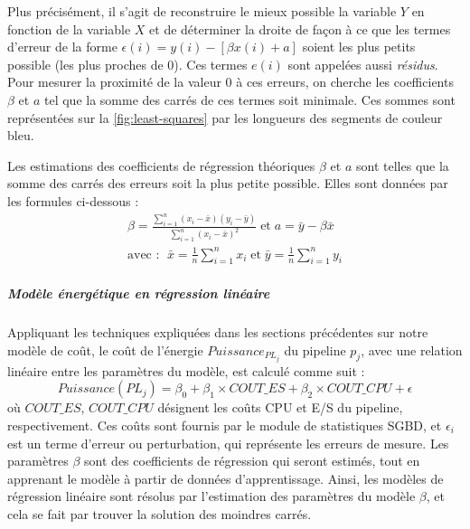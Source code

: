 Plus précisément, il s'agit de reconstruire le mieux possible la variable $Y$ en fonction de la variable $X$ et de déterminer la droite de façon à ce que les termes d'erreur de la forme $\epsilon(i) = y(i) - [\beta x(i) + a ]$ soient les plus petits possible (les plus proches de 0). Ces termes $e(i)$ sont appelées aussi \textit{résidus}. Pour mesurer la proximité de la valeur 0 à ces erreurs, on cherche les coefficients $\beta$ et $a$ tel que la somme des carrés de ces termes soit minimale. Ces sommes sont représentées sur la \ref{fig:least-squares} par les longueurs des segments de couleur bleu.

Les estimations des coefficients de régression théoriques $\beta$ et $a$ sont telles que la somme des carrés des erreurs soit la plus petite possible. Elles sont données par les formules ci-dessous \cite{Neter96} :
 \begin{equation}
 \begin{aligned}
  \beta = \frac{ \sum_{i=1}^{n}(x_i-\bar{x})(y_i-\bar{y}) }{ \sum_{i=1}^{n} (x_i-\bar{x})^2} \; \text{et} \; a = \bar{y} - \beta \bar{x} \\
  \text{avec : } \; \bar{x} = \frac{1}{n} \sum_{i=1}^{n} x_i \; \text{et} \; \bar{y} = \frac{1}{n} \sum_{i=1}^{n} y_i
  \end{aligned}
 \end{equation}

\subparagraph{Modèle énergétique en régression linéaire}
Appliquant les techniques expliquées dans les sections précédentes sur notre modèle de coût, le coût de l'énergie $Puissance_{PL_j} $ du pipeline $p_j$, avec une relation linéaire entre les paramètres du modèle, est calculé comme suit :
\begin{equation} \label{eq:lin-reg-equation}
Puissance(PL_j) = \beta_0 + \beta_1 \times COUT\_ES+ \beta_2 \times COUT\_CPU + \epsilon
\end{equation}
où $COUT\_ES$, $COUT\_CPU$ désignent les coûts CPU et E/S du pipeline, respectivement. Ces coûts sont fournis par le module de statistiques SGBD, et $\epsilon_i$ est un terme d'erreur ou perturbation, qui représente les erreurs de mesure. Les paramètres $\beta$ sont des coefficients de régression qui seront estimés, tout en apprenant le modèle à partir de données d'apprentissage. Ainsi, les modèles de régression linéaire sont résolus par l'estimation des paramètres du modèle $\beta$, et cela se fait par trouver la solution des moindres carrés. %


